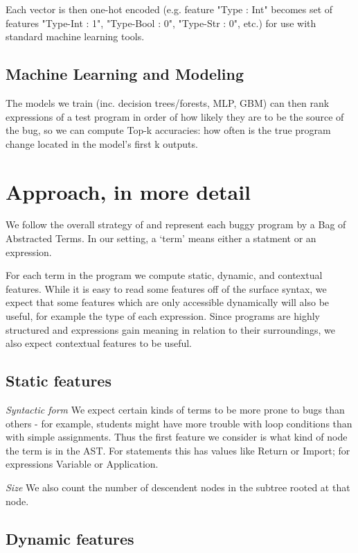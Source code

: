 \documentclass[conference]{IEEEtran}
\begin{document}
Each vector is then one-hot encoded (e.g. feature "Type : Int" becomes set
of features "Type-Int : 1", "Type-Bool : 0", "Type-Str : 0", etc.) for use with
standard machine learning tools.

\subsection{Machine Learning and Modeling}
\label{sec-model}

The models we train (inc. decision trees/forests,
MLP, GBM) can then rank expressions of a test program in order of how likely they
are to be the source of the bug, so we can compute Top-k accuracies: how often
is the true program change located in the model's first k outputs.

\section{Approach, in more detail}

We follow the overall strategy of \cite{learning-to-blame} and represent each
buggy program by a Bag of Abstracted Terms. In our setting, a `term' means either
a statment or an expression.

For each term in the program we compute static, dynamic,
and contextual features. While it is easy to read some features off of the surface
syntax, we expect that some features which are only accessible dynamically will also
be useful, for example the type of each expression. Since programs are highly
structured and expressions gain meaning in relation to their surroundings,
we also expect contextual features to be useful.

\subsection{Static features}

\emph{Syntactic form} We expect certain kinds of terms to be more prone to bugs
than others - for example, students might have more trouble with loop conditions
than with simple assignments. Thus the first feature we consider is what kind of node the term
is in the AST. For statements this has values like Return or Import; for expressions
Variable or Application.

\emph{Size} We also count the number of descendent nodes in the subtree rooted at that node.

\subsection{Dynamic features}
\end{document}
